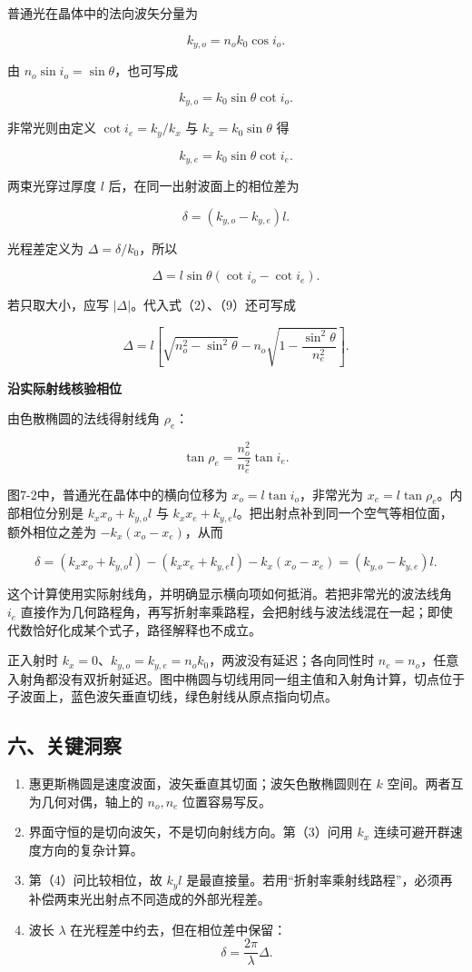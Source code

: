 \documentclass[12pt,a4paper,UTF8]{ctexart}
\newcommand{\tightlist}{\setlength{\itemsep}{0pt}\setlength{\parskip}{0pt}}
\begin{document}
普通光在晶体中的法向波矢分量为

\[k_{y,o}=n_ok_0\cos i_o.\]

由 \(n_o\sin i_o=\sin\theta\)，也可写成

\[k_{y,o}=k_0\sin\theta\cot i_o.\]

非常光则由定义 \(\cot i_e=k_y/k_x\) 与 \(k_x=k_0\sin\theta\) 得

\[k_{y,e}=k_0\sin\theta\cot i_e.\]

两束光穿过厚度 \(l\) 后，在同一出射波面上的相位差为

\[\delta=(k_{y,o}-k_{y,e})l.\]

光程差定义为 \(\Delta=\delta/k_0\)，所以

\[\boxed{
\Delta=l\sin\theta(\cot i_o-\cot i_e)}.\]

若只取大小，应写 \(|\Delta|\)。代入式（2）、（9）还可写成

\[\boxed{
\Delta=l\left[
\sqrt{n_o^2-\sin^2\theta}
-n_o\sqrt{1-\frac{\sin^2\theta}{n_e^2}}
\right]}.\]

\textbf{沿实际射线核验相位}

由色散椭圆的法线得射线角 \(\rho_e\)：

\[\tan\rho_e=\frac{n_o^2}{n_e^2}\tan i_e.\]

图7-2中，普通光在晶体中的横向位移为 \(x_o=l\tan i_o\)，非常光为
\(x_e=l\tan\rho_e\)。内部相位分别是 \(k_xx_o+k_{y,o}l\) 与
\(k_xx_e+k_{y,e}l\)。把出射点补到同一个空气等相位面，额外相位之差为
\(-k_x(x_o-x_e)\)，从而

\[\delta=(k_xx_o+k_{y,o}l)-(k_xx_e+k_{y,e}l)
-k_x(x_o-x_e)
=(k_{y,o}-k_{y,e})l.\]

这个计算使用实际射线角，并明确显示横向项如何抵消。若把非常光的波法线角
\(i_e\)
直接作为几何路程角，再写折射率乘路程，会把射线与波法线混在一起；即使代数恰好化成某个式子，路径解释也不成立。

正入射时 \(k_x=0\)、\(k_{y,o}=k_{y,e}=n_ok_0\)，两波没有延迟；各向同性时
\(n_e=n_o\)，任意入射角都没有双折射延迟。图中椭圆与切线用同一组主值和入射角计算，切点位于子波面上，蓝色波矢垂直切线，绿色射线从原点指向切点。

\subsection{六、关键洞察}\label{ux516dux5173ux952eux6d1eux5bdf-6}

\begin{enumerate}
\def\labelenumi{\arabic{enumi}.}
\tightlist
\item
  惠更斯椭圆是速度波面，波矢垂直其切面；波矢色散椭圆则在 \(k\)
  空间。两者互为几何对偶，轴上的 \(n_o,n_e\) 位置容易写反。
\item
  界面守恒的是切向波矢，不是切向射线方向。第（3）问用 \(k_x\)
  连续可避开群速度方向的复杂计算。
\item
  第（4）问比较相位，故 \(k_y l\)
  是最直接量。若用``折射率乘射线路程''，必须再补偿两束光出射点不同造成的外部光程差。
\item
  波长 \(\lambda\) 在光程差中约去，但在相位差中保留：
  \[\delta=\frac{2\pi}{\lambda}\Delta.\]
\end{enumerate}
\end{document}
